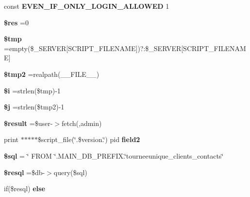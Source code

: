 \begin{DoxyCompactItemize}
const {\bfseries E\+V\+E\+N\+\_\+\+I\+F\+\_\+\+O\+N\+L\+Y\+\_\+\+L\+O\+G\+I\+N\+\_\+\+A\+L\+L\+O\+W\+ED} 1
\item 
\mbox{\label{tourneeunique__clients__contacts_8php_a49a8a4009b02e49717caa88b128affc5}} 
{\bfseries \$res} =0
\item 
\mbox{\label{tourneeunique__clients__contacts_8php_a57024d47cf8348153f5fdda16f8fefa9}} 
{\bfseries \$tmp} =empty(\$\+\_\+\+S\+E\+R\+V\+ER\mbox{[}\textquotesingle{}S\+C\+R\+I\+P\+T\+\_\+\+F\+I\+L\+E\+N\+A\+ME\textquotesingle{}\mbox{]})?\textquotesingle{}\textquotesingle{}\+:\$\+\_\+\+S\+E\+R\+V\+ER\mbox{[}\textquotesingle{}S\+C\+R\+I\+P\+T\+\_\+\+F\+I\+L\+E\+N\+A\+ME\textquotesingle{}\mbox{]}
\item 
\mbox{\label{tourneeunique__clients__contacts_8php_aed9bcb6730d1510376ce80e32bd9504d}} 
{\bfseries \$tmp2} =realpath(\+\_\+\+\_\+\+F\+I\+L\+E\+\_\+\+\_\+)
\item 
\mbox{\label{tourneeunique__clients__contacts_8php_a83018d9153d17d91fbcf3bc10158d34f}} 
{\bfseries \$i} =strlen(\$tmp)-\/1
\item 
\mbox{\label{tourneeunique__clients__contacts_8php_a6f16db779ef3ccea921b277b5dc245d1}} 
{\bfseries \$j} =strlen(\$tmp2)-\/1
\item 
\mbox{\label{tourneeunique__clients__contacts_8php_a112ef069ddc0454086e3d1e6d8d55d07}} 
{\bfseries \$result} =\$user-\/$>$fetch(\textquotesingle{}\textquotesingle{},\textquotesingle{}admin\textquotesingle{})
\item 
\mbox{\label{tourneeunique__clients__contacts_8php_af9edfce80596a171cfb2884ba7ad01df}} 
print $\ast$$\ast$$\ast$$\ast$$\ast$\$script\+\_\+file(\char`\"{}.\$version.\char`\"{}) pid {\bfseries field2}
\item 
\mbox{\label{tourneeunique__clients__contacts_8php_a047170d6020a882807665812a27e2525}} 
{\bfseries \$sql} = \char`\"{} F\+R\+OM \char`\"{}.M\+A\+I\+N\+\_\+\+D\+B\+\_\+\+P\+R\+E\+F\+I\+X.\char`\"{}tourneeunique\+\_\+clients\+\_\+contacts\char`\"{}
\item 
\mbox{\label{tourneeunique__clients__contacts_8php_a6adc5ef389ab51c21dee69262018d615}} 
{\bfseries \$resql} =\$db-\/$>$query(\$sql)
\item 
if(\$resql) {\bfseries else}
\end{DoxyCompactItemize}


